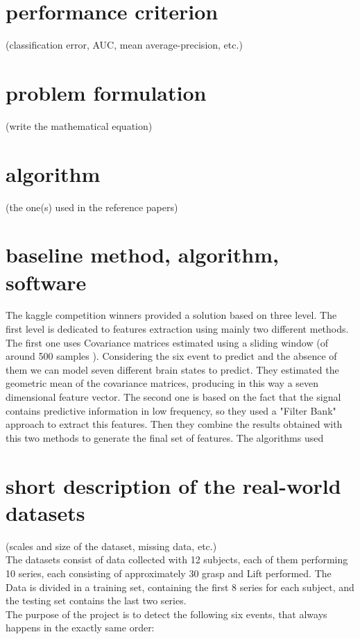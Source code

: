 \documentclass[final,leqno,onefignum,onetabnum]{siamltexmm}
\begin{document}
\section{performance criterion}
(classification error, AUC, mean average-precision, etc.)

\section{problem formulation}
(write the mathematical equation)

\section{algorithm}
 (the one(s) used in the reference papers)

\section{baseline method, algorithm, software}
The kaggle competition winners \cite{kaggle} provided a solution based on three level. The first level is dedicated to features extraction using mainly two different methods. The first one uses Covariance matrices  estimated using a sliding window (of around 500 samples ). Considering the six event to predict and the absence of them we can model seven different brain states to predict. They estimated the geometric mean of the covariance matrices, producing in this way a seven dimensional feature vector. The second one is based on the fact that the signal contains predictive information in low frequency, so they used a  "Filter Bank" approach to extract this features. Then they combine the results obtained with this two methods to generate the final set of features. 
The algorithms used 
 







\section{short description of the real-world datasets}
(scales and size of the dataset, missing data, etc.)\\
The  datasets consist of data collected with 12 subjects, each of them performing 10 series, each consisting of approximately 30 grasp and Lift performed. The Data is divided in a  training set, containing the first 8 series for each subject, and  the testing set contains the last two series.\\
The purpose of the project is to detect the following six events, that always happens in the exactly same order: 
\end{document}
